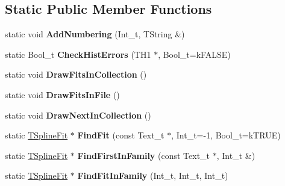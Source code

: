 \subsection*{Static Public Member Functions}
\begin{DoxyCompactItemize}
\item 
\hypertarget{classTSplineFit_a76ffe87f58f9e35803112f2d3322ea05}{static void {\bfseries Add\-Numbering} (Int\-\_\-t, T\-String \&)}\label{classTSplineFit_a76ffe87f58f9e35803112f2d3322ea05}

\item 
\hypertarget{classTSplineFit_aebe443c5437e188d01bed7159595ac9d}{static Bool\-\_\-t {\bfseries Check\-Hist\-Errors} (T\-H1 $\ast$, Bool\-\_\-t=k\-F\-A\-L\-S\-E)}\label{classTSplineFit_aebe443c5437e188d01bed7159595ac9d}

\item 
\hypertarget{classTSplineFit_a052354cb5dac6b4ecb11bb25751d9abb}{static void {\bfseries Draw\-Fits\-In\-Collection} ()}\label{classTSplineFit_a052354cb5dac6b4ecb11bb25751d9abb}

\item 
\hypertarget{classTSplineFit_ad3afecb9461482859141b3cacb718a7c}{static void {\bfseries Draw\-Fits\-In\-File} ()}\label{classTSplineFit_ad3afecb9461482859141b3cacb718a7c}

\item 
\hypertarget{classTSplineFit_ab672c4e604f7d46d211db3be3559cfb3}{static void {\bfseries Draw\-Next\-In\-Collection} ()}\label{classTSplineFit_ab672c4e604f7d46d211db3be3559cfb3}

\item 
\hypertarget{classTSplineFit_ab1c4b5f9a9870ec7c2b2d5ea52407696}{static \hyperlink{classTSplineFit}{T\-Spline\-Fit} $\ast$ {\bfseries Find\-Fit} (const Text\-\_\-t $\ast$, Int\-\_\-t=-\/1, Bool\-\_\-t=k\-T\-R\-U\-E)}\label{classTSplineFit_ab1c4b5f9a9870ec7c2b2d5ea52407696}

\item 
\hypertarget{classTSplineFit_a6cbae59f46987ad2186f44f60276685e}{static \hyperlink{classTSplineFit}{T\-Spline\-Fit} $\ast$ {\bfseries Find\-First\-In\-Family} (const Text\-\_\-t $\ast$, Int\-\_\-t \&)}\label{classTSplineFit_a6cbae59f46987ad2186f44f60276685e}

\item 
\hypertarget{classTSplineFit_a975d6a369c95c6efcc5a21835fa0e43e}{static \hyperlink{classTSplineFit}{T\-Spline\-Fit} $\ast$ {\bfseries Find\-Fit\-In\-Family} (Int\-\_\-t, Int\-\_\-t, Int\-\_\-t)}\label{classTSplineFit_a975d6a369c95c6efcc5a21835fa0e43e}


\end{DoxyCompactItemize}
